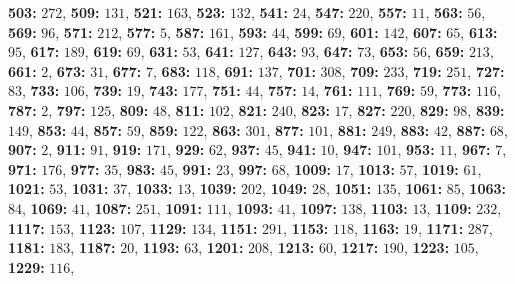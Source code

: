\textsf{\bfseries 503:} $272$, \textsf{\bfseries 509:} $131$, \textsf{\bfseries 521:} $163$, \textsf{\bfseries 523:} $132$, \textsf{\bfseries 541:} $24$, \textsf{\bfseries 547:} $220$, 
\textsf{\bfseries 557:} $11$, \textsf{\bfseries 563:} $56$, \textsf{\bfseries 569:} $96$, \textsf{\bfseries 571:} $212$, \textsf{\bfseries 577:} $5$, \textsf{\bfseries 587:} $161$, \textsf{\bfseries 593:} $44$, \textsf{\bfseries 599:} $69$, \textsf{\bfseries 601:} $142$, \textsf{\bfseries 607:} $65$, \textsf{\bfseries 613:} $95$, \textsf{\bfseries 617:} $189$, \textsf{\bfseries 619:} $69$, \textsf{\bfseries 631:} $53$, \textsf{\bfseries 641:} $127$, \textsf{\bfseries 643:} $93$, \textsf{\bfseries 647:} $73$, \textsf{\bfseries 653:} $56$, \textsf{\bfseries 659:} $213$, \textsf{\bfseries 661:} $2$, \textsf{\bfseries 673:} $31$, \textsf{\bfseries 677:} $7$, \textsf{\bfseries 683:} $118$, \textsf{\bfseries 691:} $137$, \textsf{\bfseries 701:} $308$, \textsf{\bfseries 709:} $233$, \textsf{\bfseries 719:} $251$, \textsf{\bfseries 727:} $83$, \textsf{\bfseries 733:} $106$, \textsf{\bfseries 739:} $19$, \textsf{\bfseries 743:} $177$, \textsf{\bfseries 751:} $44$, \textsf{\bfseries 757:} $14$, \textsf{\bfseries 761:} $111$, \textsf{\bfseries 769:} $59$, \textsf{\bfseries 773:} $116$, \textsf{\bfseries 787:} $2$, \textsf{\bfseries 797:} $125$, \textsf{\bfseries 809:} $48$, \textsf{\bfseries 811:} $102$, \textsf{\bfseries 821:} $240$, \textsf{\bfseries 823:} $17$, \textsf{\bfseries 827:} $220$, \textsf{\bfseries 829:} $98$, \textsf{\bfseries 839:} $149$, \textsf{\bfseries 853:} $44$, \textsf{\bfseries 857:} $59$, \textsf{\bfseries 859:} $122$, \textsf{\bfseries 863:} $301$, \textsf{\bfseries 877:} $101$, \textsf{\bfseries 881:} $249$, \textsf{\bfseries 883:} $42$, \textsf{\bfseries 887:} $68$, \textsf{\bfseries 907:} $2$, \textsf{\bfseries 911:} $91$, \textsf{\bfseries 919:} $171$, \textsf{\bfseries 929:} $62$, \textsf{\bfseries 937:} $45$, \textsf{\bfseries 941:} $10$, \textsf{\bfseries 947:} $101$, \textsf{\bfseries 953:} $11$, \textsf{\bfseries 967:} $7$, \textsf{\bfseries 971:} $176$, \textsf{\bfseries 977:} $35$, \textsf{\bfseries 983:} $45$, \textsf{\bfseries 991:} $23$, \textsf{\bfseries 997:} $68$, \textsf{\bfseries 1009:} $17$, \textsf{\bfseries 1013:} $57$, \textsf{\bfseries 1019:} $61$, \textsf{\bfseries 1021:} $53$, \textsf{\bfseries 1031:} $37$, \textsf{\bfseries 1033:} $13$, \textsf{\bfseries 1039:} $202$, \textsf{\bfseries 1049:} $28$, \textsf{\bfseries 1051:} $135$, \textsf{\bfseries 1061:} $85$, \textsf{\bfseries 1063:} $84$, \textsf{\bfseries 1069:} $41$, \textsf{\bfseries 1087:} $251$, \textsf{\bfseries 1091:} $111$, \textsf{\bfseries 1093:} $41$, \textsf{\bfseries 1097:} $138$, \textsf{\bfseries 1103:} $13$, \textsf{\bfseries 1109:} $232$, \textsf{\bfseries 1117:} $153$, \textsf{\bfseries 1123:} $107$, \textsf{\bfseries 1129:} $134$, \textsf{\bfseries 1151:} $291$, \textsf{\bfseries 1153:} $118$, \textsf{\bfseries 1163:} $19$, \textsf{\bfseries 1171:} $287$, \textsf{\bfseries 1181:} $183$, \textsf{\bfseries 1187:} $20$, \textsf{\bfseries 1193:} $63$, \textsf{\bfseries 1201:} $208$, \textsf{\bfseries 1213:} $60$, \textsf{\bfseries 1217:} $190$, \textsf{\bfseries 1223:} $105$, \textsf{\bfseries 1229:} $116$, 
